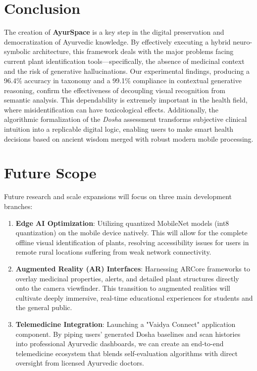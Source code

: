 \documentclass[12pt, a4paper]{report}
\begin{document}
\section{Conclusion}
The creation of \textbf{AyurSpace} is a key step in the digital preservation and democratization of Ayurvedic knowledge. By effectively executing a hybrid neuro-symbolic architecture, this framework deals with the major problems facing current plant identification tools—specifically, the absence of medicinal context and the risk of generative hallucinations. Our experimental findings, producing a 96.4\% accuracy in taxonomy and a 99.1\% compliance in contextual generative reasoning, confirm the effectiveness of decoupling visual recognition from semantic analysis. This dependability is extremely important in the health field, where misidentification can have toxicological effects. Additionally, the algorithmic formalization of the \textit{Dosha} assessment transforms subjective clinical intuition into a replicable digital logic, enabling users to make smart health decisions based on ancient wisdom merged with robust modern mobile processing.

\section{Future Scope}
Future research and scale expansions will focus on three main development branches:
\begin{enumerate}
    \item \textbf{Edge AI Optimization}: Utilizing quantized MobileNet models (int8 quantization) on the mobile device natively. This will allow for the complete offline visual identification of plants, resolving accessibility issues for users in remote rural locations suffering from weak network connectivity.
    \item \textbf{Augmented Reality (AR) Interfaces}: Harnessing ARCore frameworks to overlay medicinal properties, alerts, and detailed plant structures directly onto the camera viewfinder. This transition to augmented realities will cultivate deeply immersive, real-time educational experiences for students and the general public.
    \item \textbf{Telemedicine Integration}: Launching a "Vaidya Connect" application component. By piping users’ generated Dosha baselines and scan histories into professional Ayurvedic dashboards, we can create an end-to-end telemedicine ecosystem that blends self-evaluation algorithms with direct oversight from licensed Ayurvedic doctors.
\end{enumerate}
\end{document}
